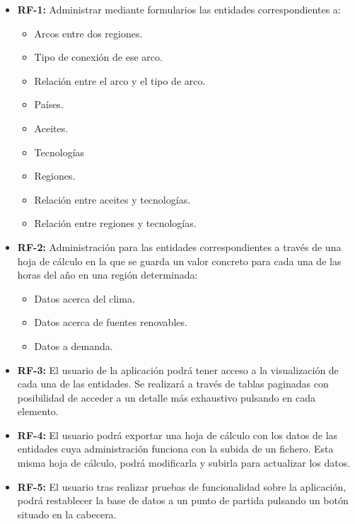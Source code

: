 \begin{itemize}
	
	\item \textbf{RF-1:} Administrar mediante formularios las entidades correspondientes a: 

		\begin{itemize}
			
			\item Arcos entre dos regiones.
			\item Tipo de conexión de ese arco.
			\item Relación entre el arco y el tipo de arco.
			\item Países.
			\item Aceites.
			\item Tecnologías
			\item Regiones.
			\item Relación entre aceites y tecnologías.
			\item Relación entre regiones y tecnologías.
			
		\end{itemize}
	
	\item \textbf{RF-2:} Administración para las entidades correspondientes a través de una hoja de cálculo en la que se guarda un valor concreto para cada una de las horas del año en una región determinada:
	
		\begin{itemize}
			
			\item Datos acerca del clima.
			\item Datos acerca de fuentes renovables.
			\item Datos a demanda.
			
		\end{itemize}
	
	\item \textbf{RF-3:} El usuario de la aplicación podrá tener acceso a la visualización de cada una de las entidades. Se realizará a través de tablas paginadas con posibilidad de acceder a un detalle más exhaustivo pulsando en cada elemento.
	
	\item \textbf{RF-4:} El usuario podrá exportar una hoja de cálculo con los datos de las entidades cuya administración funciona con la subida de un fichero. Esta misma hoja de cálculo, podrá modificarla y subirla para actualizar los datos.
	
	\item \textbf{RF-5:} El usuario tras realizar pruebas de funcionalidad sobre la aplicación, podrá restablecer la base de datos a un punto de partida pulsando un botón situado en la cabecera.
	
\end{itemize}

